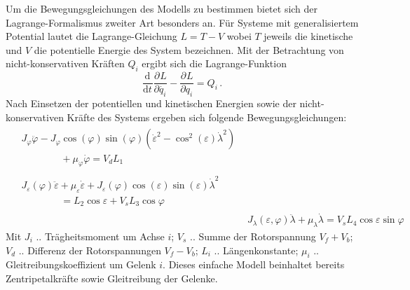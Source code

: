 \documentclass[10pt,twocolumn]{article}
\newcommand{\partiell}[3][]{\frac{\partial^{#1}#2}{\partial{#3}^{#1}}}
\newcommand{\diff}[3][]{\frac{\mathrm{d}^{#1}#2}{\mathrm{d}{#3}^{#1}}}
\begin{document}
	Um die Bewegungsgleichungen des Modells zu bestimmen bietet sich der Lagrange-Formalismus zweiter Art besonders an. Für Systeme mit generalisiertem Potential lautet die Lagrange-Gleichung $L = T -V$ wobei $T$ jeweils die kinetische und $V$ die potentielle Energie des System bezeichnen.
	Mit der Betrachtung von nicht-konservativen Kräften $Q_i$ ergibt sich die Lagrange-Funktion
	\begin{equation}\label{eq:lagrange}
	\diff{}{t} \partiell{L}{\dot{q_i}} - \partiell{L}{q_i}=Q_i\, .
	\end{equation}
	Nach Einsetzen der potentiellen und kinetischen Energien sowie der nicht-konservativen Kräfte des Systems ergeben sich folgende Bewegungsgleichungen:
	\begin{subequations}
		\begin{align}
			\begin{split}
		&J_\varphi \ddot{\varphi} - J_\varphi \cos (\varphi) \sin (\varphi) (\dot{\varepsilon}^2- \cos^2 (\varepsilon) \dot{\lambda}^2)\\
		&\qquad\qquad+ \mu_\varphi \dot{\varphi} = V_d L_1
			\end{split}
			\\
		\begin{split}		
			&J_\varepsilon(\varphi)\ddot{\varepsilon} + \mu_\varepsilon \dot{\varepsilon} + J_\varepsilon(\varphi) \cos (\varepsilon) \sin (\varepsilon) \dot{\lambda}^2\\
			&\qquad\qquad= L_2 \cos \varepsilon + V_s L_3 \cos \varphi
		\end{split}
		\\
		&J_\lambda(\varepsilon,\varphi) \ddot{\lambda} + \mu_\lambda \dot{\lambda} = V_s L_4 \cos \varepsilon \sin \varphi
		\end{align}
		\label{eq:lagrange_result}
	\end{subequations}
	Mit $J_i$ .. Trägheitsmoment um Achse $i$; $V_s$ .. Summe der Rotorspannung $V_f + V_b$; $V_d$ .. Differenz der Rotorspannungen $V_f - V_b$; $L_i$ .. Längenkonstante; $\mu_i$ .. Gleitreibungskoeffizient um Gelenk $i$. Dieses einfache Modell beinhaltet bereits Zentripetalkräfte sowie Gleitreibung der Gelenke.
\end{document}
